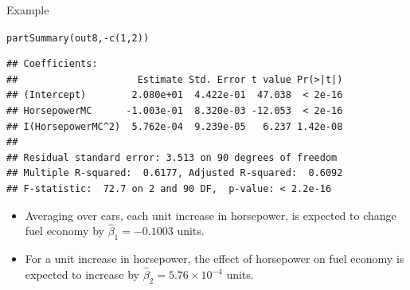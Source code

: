 \documentclass{beamer}\usepackage[]{graphicx}\usepackage[]{color}
\makeatletter
\newcommand{\hlnum}[1]{\textcolor[rgb]{0.69,0.494,0}{#1}}%
\newcommand{\hlopt}[1]{\textcolor[rgb]{0,0,0}{#1}}%
\newcommand{\hlstd}[1]{\textcolor[rgb]{0,0,0}{#1}}%
\newcommand{\hlkwd}[1]{\textcolor[rgb]{0.004,0.004,0.506}{#1}}%
\newenvironment{kframe}{%
 \def\at@end@of@kframe{}%
 \ifinner\ifhmode%
  \def\at@end@of@kframe{\end{minipage}}%
  \begin{minipage}{\columnwidth}%
 \fi\fi%
 \def\FrameCommand##1{\hskip\@totalleftmargin \hskip-\fboxsep
 \colorbox{shadecolor}{##1}\hskip-\fboxsep
     \hskip-\linewidth \hskip-\@totalleftmargin \hskip\columnwidth}%
 \MakeFramed {\advance\hsize-\width
   \@totalleftmargin\z@ \linewidth\hsize
   \@setminipage}}%
 {\par\unskip\endMakeFramed%
 \at@end@of@kframe}
\newenvironment{knitrout}{}{} %
\makeatother
\begin{document}

\begin{frame}[fragile]{Example}

\begin{knitrout}\footnotesize
{}\color{fgcolor}\begin{kframe}
\begin{alltt}
\hlkwd{partSummary}\hlstd{(out8,} \hlopt{-}\hlkwd{c}\hlstd{(}\hlnum{1}\hlstd{,} \hlnum{2}\hlstd{))}
\end{alltt}
\begin{verbatim}
## Coefficients:
##                     Estimate Std. Error t value Pr(>|t|)
## (Intercept)        2.080e+01  4.422e-01  47.038  < 2e-16
## HorsepowerMC      -1.003e-01  8.320e-03 -12.053  < 2e-16
## I(HorsepowerMC^2)  5.762e-04  9.239e-05   6.237 1.42e-08
## 
## Residual standard error: 3.513 on 90 degrees of freedom
## Multiple R-squared:  0.6177,	Adjusted R-squared:  0.6092 
## F-statistic:  72.7 on 2 and 90 DF,  p-value: < 2.2e-16
\end{verbatim}
\end{kframe}
\end{knitrout}
\begin{itemize}
\item Averaging over cars, each unit increase in horsepower, is expected to 
  change fuel economy by $\hat{\beta}_1 = 
  -0.1003$ units.
  \vc
\item For a unit increase in horsepower, the effect of horsepower on fuel 
  economy is expected to increase by $\hat{\beta}_2 = 
  \ensuremath{5.76\times 10^{-4}}$ units.
\end{itemize}

\end{frame}

\end{document}
